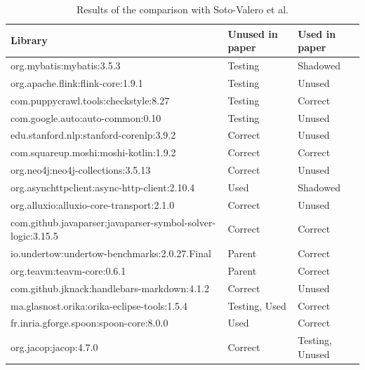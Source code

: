 \begin{table}[ht]
\begin{center}
\begin{tabular}{|l|l|l|}
\hline
\textbf{Library} & \textbf{Unused in paper} & \textbf{Used in paper} \\ \hline
org.mybatis:mybatis:3.5.3                                   & Testing       & Shadowed        \\ \hline
org.apache.flink:flink-core:1.9.1                           & Testing       & Unused          \\ \hline
com.puppycrawl.tools:checkstyle:8.27                        & Testing       & Correct         \\ \hline
com.google.auto:auto-common:0.10                            & Testing       & Unused          \\ \hline
edu.stanford.nlp:stanford-corenlp:3.9.2                     & Correct       & Unused          \\ \hline
com.squareup.moshi:moshi-kotlin:1.9.2                       & Correct       & Correct         \\ \hline
org.neo4j:neo4j-collections:3.5.13                          & Correct       & Unused          \\ \hline
org.asynchttpclient:async-http-client:2.10.4                & Used          & Shadowed        \\ \hline
org.alluxio:alluxio-core-transport:2.1.0                    & Correct       & Unused          \\ \hline
com.github.javaparser:javaparser-symbol-solver-logic:3.15.5 & Correct       & Correct         \\ \hline
io.undertow:undertow-benchmarks:2.0.27.Final                & Parent        & Correct         \\ \hline
org.teavm:teavm-core:0.6.1                                  & Parent        & Correct         \\ \hline
com.github.jknack:handlebars-markdown:4.1.2                 & Correct       & Unused          \\ \hline
ma.glasnost.orika:orika-eclipse-tools:1.5.4                 & Testing, Used & Correct         \\ \hline
fr.inria.gforge.spoon:spoon-core:8.0.0                      & Used          & Correct         \\ \hline
org.jacop:jacop:4.7.0                                       & Correct       & Testing, Unused \\ \hline
\end{tabular}
\end{center}
\caption{Results of the comparison with Soto-Valero et al. \cite{soto2020comprehensive}}
\label{table:comparison-results}
\end{table}

